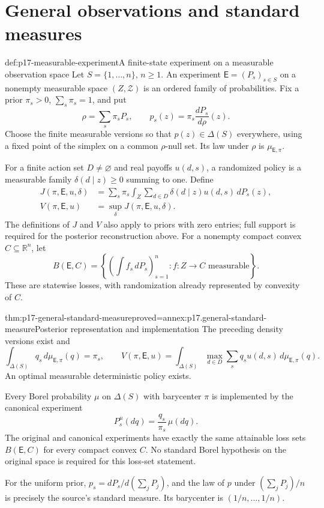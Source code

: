 \section{General observations and standard measures}
\label{sec:p17-general-experiments}

\begin{hbdefinition}{def:p17-measurable-experiment}{A finite-state experiment on a measurable observation space}
Let \(S=\{1,\ldots,n\}\), \(n\geq1\).
An experiment \(\mathsf E=(P_s)_{s\in S}\) on a nonempty measurable
space \((Z,\mathcal Z)\) is an ordered family of probabilities.
Fix a prior \(\pi_s>0\), \(\sum_s\pi_s=1\), and put
\[
      \rho=\sum_s\pi_sP_s,\qquad
      p_s(z)=\pi_s\frac{dP_s}{d\rho}(z).
\]
Choose the finite measurable versions so that
\(p(z)\in\Delta(S)\) everywhere, using a fixed point of the simplex
on a common \(\rho\)-null set. Its law under \(\rho\) is
\(\mu_{\mathsf E,\pi}\).

For a finite action set \(D\ne\varnothing\) and real payoffs \(u(d,s)\),
a randomized policy is a measurable family
\(\delta(d\mid z)\geq0\) summing to one. Define
\[
 \begin{split}
 J(\pi,\mathsf E,u,\delta)
     &=\sum_s\pi_s\int_Z\sum_{d\in D}\delta(d\mid z)u(d,s)\,dP_s(z),\\
 V(\pi,\mathsf E,u)&=\sup_\delta J(\pi,\mathsf E,u,\delta).
 \end{split}
\]
The definitions of \(J\) and \(V\) also apply to priors with zero
entries; full support is required for the posterior reconstruction above.
For a nonempty compact convex \(C\subseteq\mathbb R^n\), let
\[
 B(\mathsf E,C)=
 \left\{\left(\int f_s\,dP_s\right)_{s=1}^n:
                             f:Z\to C\text{ measurable}\right\}.
\]
These are statewise losses, with randomization already represented by
convexity of \(C\).
\end{hbdefinition}

\begin{hbtheorem}{thm:p17-general-standard-measure}{proved=annex:p17.general-standard-measure}{Posterior representation and implementation}
The preceding density versions exist and
\[
 \int_{\Delta(S)}q_s\,d\mu_{\mathsf E,\pi}(q)=\pi_s,\qquad
 V(\pi,\mathsf E,u)=
                \int_{\Delta(S)}\max_{d\in D}\sum_sq_su(d,s)
                                             \,d\mu_{\mathsf E,\pi}(q).
\]
An optimal measurable deterministic policy exists.

Every Borel probability \(\mu\) on \(\Delta(S)\) with barycenter \(\pi\)
is implemented by the canonical experiment
\[
                       P_s^\mu(dq)=\frac{q_s}{\pi_s}\,\mu(dq).
\]
The original and canonical experiments have exactly the same attainable
loss sets \(B(\mathsf E,C)\) for every compact convex \(C\).
No standard Borel hypothesis on the original space is required for this
loss-set statement.

For the uniform prior, \(p_s=dP_s/d(\sum_jP_j)\), and the law of \(p\)
under \((\sum_jP_j)/n\) is precisely the source's standard measure.
Its barycenter is \((1/n,\ldots,1/n)\).
\end{hbtheorem}

